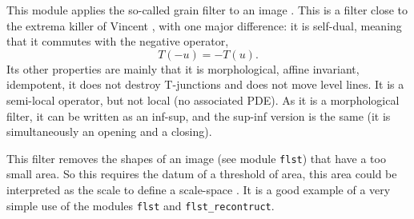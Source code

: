 This module applies the so-called grain filter to an image \cite{masnou.morel:image}
.
This is a filter close to the extrema killer of Vincent \cite{vincent:grayscale}, with
one major difference: it is self-dual, meaning that it commutes with the
negative operator,
$$
T(-u) = -T(u).
$$
Its other properties are mainly that it is morphological, affine invariant,
idempotent,
it does not destroy T-junctions and does not move level lines. It is a
semi-local operator, but not local (no associated PDE).
As it is a morphological filter, it can be written as an inf-sup, and the
sup-inf version is the same (it is simultaneously an opening and a closing).

This filter removes the shapes of an image (see module \verb+flst+) that
have a too small area. So this requires the datum of a threshold of area, this
area could be interpreted as the scale to define a scale-space
\cite{monasse.guichard:scale-space}\cite{monasse.guichard:fast}.
It is a good example of a very simple use of the modules \verb+flst+ and
\verb+flst_recontruct+.

